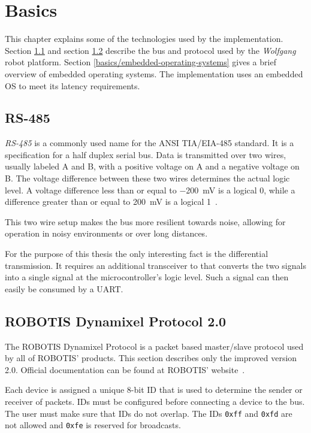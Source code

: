 \chapter{Basics}
\label{basics}

This chapter explains some of the technologies used by the implementation. Section \ref{basics/rs-485}
and section \ref{basics/dynamixel-protocol} describe the bus and protocol used by the \textit{Wolfgang}
robot platform. Section \ref{basics/embedded-operating-systems} gives a brief overview of embedded
operating systems. The implementation uses an embedded OS to meet its latency requirements.

\section{RS-485}
\label{basics/rs-485}

\textit{RS-485} is a commonly used name for the ANSI TIA/EIA-485 standard. It is a specification for
a half duplex serial bus. Data is transmitted over two wires, usually labeled A and B, with a positive
voltage on A and a negative voltage on B. The voltage difference between these two wires determines
the actual logic level. A voltage difference less than or equal to \SI{-200}{\milli\volt} is a logical
0, while a difference greater than or equal to \SI{200}{\milli\volt} is a logical 1~\cite{rs-485-overview}.

This two wire setup makes the bus more resilient towards noise, allowing for operation in noisy
environments or over long distances.

For the purpose of this thesis the only interesting fact is the differential transmission. It requires
an additional transceiver to that converts the two signals into a single signal at the microcontroller's
logic level. Such a signal can then easily be consumed by a UART.

\section{ROBOTIS Dynamixel Protocol 2.0}
\label{basics/dynamixel-protocol}

The ROBOTIS Dynamixel Protocol is a packet based master/slave protocol used by all of ROBOTIS' products.
This section describes only the improved version 2.0. Official documentation can be found at ROBOTIS'
website~\cite{dynamixel-protocol-2}.

Each device is assigned a unique 8-bit ID that is used to determine the sender or receiver of packets.
IDs must be configured before connecting a device to the bus. The user must make sure that IDs do not
overlap. The IDs \lstinline{0xff} and \lstinline{0xfd} are not allowed and \lstinline{0xfe} is reserved
for broadcasts.

